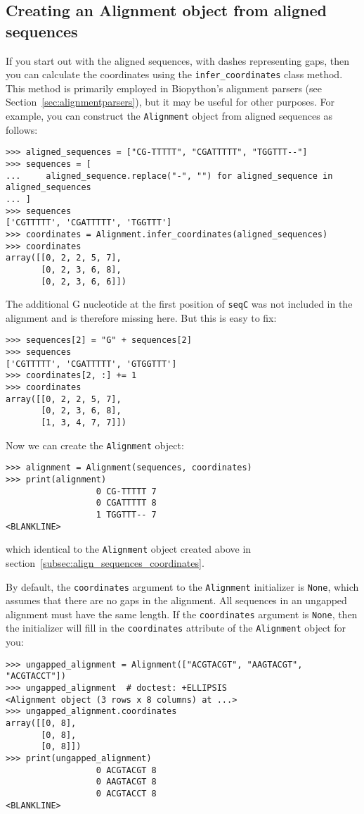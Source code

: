 \subsection{Creating an Alignment object from aligned sequences}
\label{subsec:align_infer_coordinates}

If you start out with the aligned sequences, with dashes representing gaps, then you can calculate the coordinates using the \verb|infer_coordinates| class method. This method is primarily employed in Biopython's alignment parsers (see Section~\ref{sec:alignmentparsers}), but it may be useful for other purposes. For example, you can construct the \verb|Alignment| object from aligned sequences as follows:
\begin{verbatim}
>>> aligned_sequences = ["CG-TTTTT", "CGATTTTT", "TGGTTT--"]
>>> sequences = [
...     aligned_sequence.replace("-", "") for aligned_sequence in aligned_sequences
... ]
>>> sequences
['CGTTTTT', 'CGATTTTT', 'TGGTTT']
>>> coordinates = Alignment.infer_coordinates(aligned_sequences)
>>> coordinates
array([[0, 2, 2, 5, 7],
       [0, 2, 3, 6, 8],
       [0, 2, 3, 6, 6]])
\end{verbatim}
The additional G nucleotide at the first position of \verb|seqC| was not included in the alignment and is therefore missing here. But this is easy to fix:
\begin{verbatim}
>>> sequences[2] = "G" + sequences[2]
>>> sequences
['CGTTTTT', 'CGATTTTT', 'GTGGTTT']
>>> coordinates[2, :] += 1
>>> coordinates
array([[0, 2, 2, 5, 7],
       [0, 2, 3, 6, 8],
       [1, 3, 4, 7, 7]])
\end{verbatim}
Now we can create the \verb|Alignment| object:
\begin{verbatim}
>>> alignment = Alignment(sequences, coordinates)
>>> print(alignment)
                  0 CG-TTTTT 7
                  0 CGATTTTT 8
                  1 TGGTTT-- 7
<BLANKLINE>
\end{verbatim}
which identical to the \verb|Alignment| object created above in section~\ref{subsec:align_sequences_coordinates}.

By default, the \verb|coordinates| argument to the \verb|Alignment| initializer is \verb|None|, which assumes that there are no gaps in the alignment. All sequences in an ungapped alignment must have the same length. If the \verb|coordinates| argument is \verb|None|, then the initializer will fill in the \verb|coordinates| attribute of the \verb|Alignment| object for you:
\begin{verbatim}
>>> ungapped_alignment = Alignment(["ACGTACGT", "AAGTACGT", "ACGTACCT"])
>>> ungapped_alignment  # doctest: +ELLIPSIS
<Alignment object (3 rows x 8 columns) at ...>
>>> ungapped_alignment.coordinates
array([[0, 8],
       [0, 8],
       [0, 8]])
>>> print(ungapped_alignment)
                  0 ACGTACGT 8
                  0 AAGTACGT 8
                  0 ACGTACCT 8
<BLANKLINE>
\end{verbatim}

